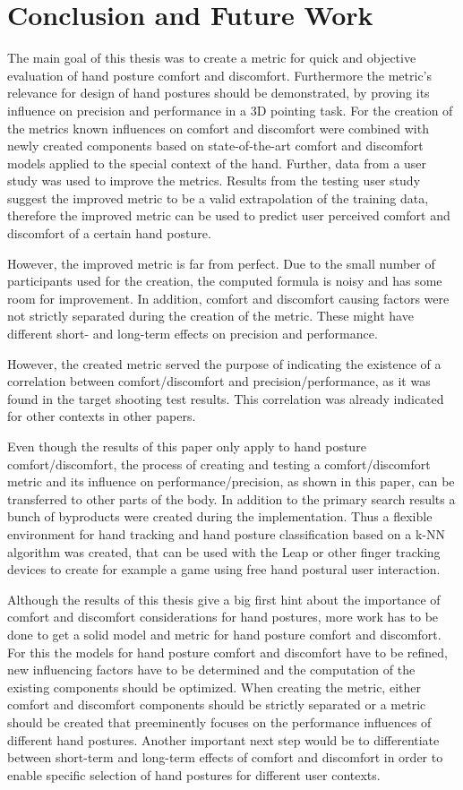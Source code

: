\chapter{Conclusion and Future Work}\label{chapter:conclusion}

The main goal of this thesis was to create a metric for quick and objective evaluation of hand posture comfort and discomfort. Furthermore the metric's relevance for design of hand postures should be demonstrated, by proving its influence on precision and performance in a 3D pointing task. 
For the creation of the metrics known influences on comfort and discomfort were combined with newly created components based on state-of-the-art comfort and discomfort models applied to the special context of the hand. Further, data from a user study was used to improve the metrics. Results from the testing user study suggest the improved metric to be a valid extrapolation of the training data, therefore the improved metric can be used to predict user perceived comfort and discomfort of a certain hand posture.

However, the improved metric is far from perfect. Due to the small number of participants used for the creation, the computed formula is noisy and has some room for improvement. In addition, comfort and discomfort causing factors were not strictly separated during the creation of the metric. These might have different short- and long-term effects on precision and performance. 

However, the created metric served the purpose of indicating the existence of a correlation between comfort/discomfort and precision/performance, as it was found in the target shooting test results. This correlation was already indicated for other contexts in other papers.

Even though the results of this paper only apply to hand posture comfort/discomfort, the process of creating and testing a comfort/discomfort metric and its influence on performance/precision, as shown in this paper, can be transferred to other parts of the body. In addition to the primary search results a bunch of byproducts were created during the implementation. Thus a flexible environment for hand tracking and hand posture classification based on a k-NN algorithm was created, that can be used with the Leap or other finger tracking devices to create for example a game using free hand postural user interaction.

Although the results of this thesis give a big first hint about the importance of comfort and discomfort considerations for hand postures, more work has to be done to get a solid model and metric for hand posture comfort and discomfort. For this the models for hand posture comfort and discomfort have to be refined, new influencing factors have to be determined and the computation of the existing components should be optimized. When creating the metric, either comfort and discomfort components should be strictly separated or a metric should be created that preeminently focuses on the performance influences of different hand postures. Another important next step would be to differentiate between short-term and long-term effects of comfort and discomfort in order to enable specific selection of hand postures for different user contexts.